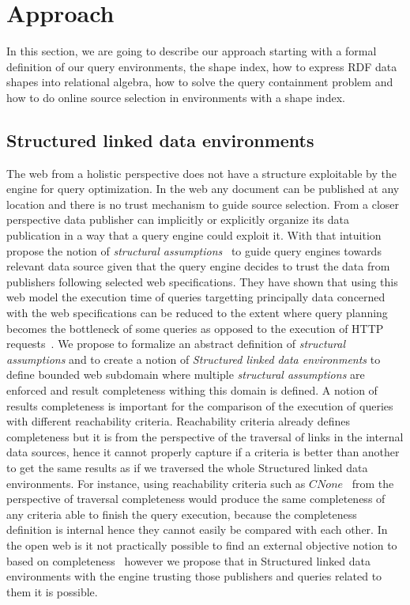 \section{Approach}

In this section, we are going to describe our approach starting with a formal definition of our query environments,
the shape index, how to express RDF data shapes into relational algebra, how to solve the query containment problem
and how to do online source selection in environments with a shape index.

\subsection{Structured linked data environments}
The web from a holistic perspective does not have a structure exploitable by the engine for query optimization.
In the web any document can be published at any location and there is no trust mechanism to guide source selection.
From a closer perspective data publisher can implicitly or explicitly organize its data publication in a way that a query engine could exploit it.
With that intuition \citeauthor{Taelman2023} propose the notion of \emph{structural assumptions}~\cite{Taelman2023} to guide query engines towards 
relevant data source given that the query engine decides to trust the data from publishers following selected web specifications.
They have shown that using this web model the execution time of queries targetting principally data concerned with the web specifications can 
be reduced to the extent where query planning becomes the bottleneck of some queries as opposed to the execution of HTTP requests~\cite{Taelman2023}.
We propose to formalize an abstract definition of \emph{structural assumptions} and to create a notion of \emph{Structured linked data environments}
to define bounded web subdomain where multiple \emph{structural assumptions} are enforced and result completeness withing this domain is defined.
A notion of results completeness is important for the comparison of the execution of queries with different reachability criteria.
Reachability criteria already defines completeness but it is from the perspective of the traversal of links in the internal data sources, hence
it cannot properly capture if a criteria is better than another to get the same results as if we traversed the whole Structured linked data environments.
For instance, using reachability criteria such as $CNone$~\cite{Hartig2012} from the perspective of traversal completeness would produce the same completeness of
any criteria able to finish the query execution, because the completeness definition is internal hence they cannot easily be compared with each other.
In the open web is it not practically possible to find an external objective notion to based on completeness~\cite{Hartig2012} however we propose that in Structured linked data environments
with the engine trusting those publishers and queries related to them it is possible.

